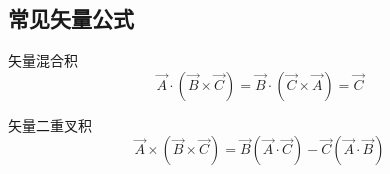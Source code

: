 \begin{appendix}  
	\chapter{常见矢量公式}
	矢量混合积
	\[
	\vec{A}\cdot \left( \vec{B}\times \vec{C} \right) =\vec{B}\cdot \left( \vec{C}\times \vec{A} \right) =\vec{C}
	\]
	
	
	矢量二重叉积
	\[
	\vec{A}\times \left( \vec{B}\times \vec{C} \right) =\vec{B}\left( \vec{A}\cdot \vec{C} \right) -\vec{C}\left( \vec{A}\cdot \vec{B} \right) 
	\]
	
	
	
		
\end{appendix} 